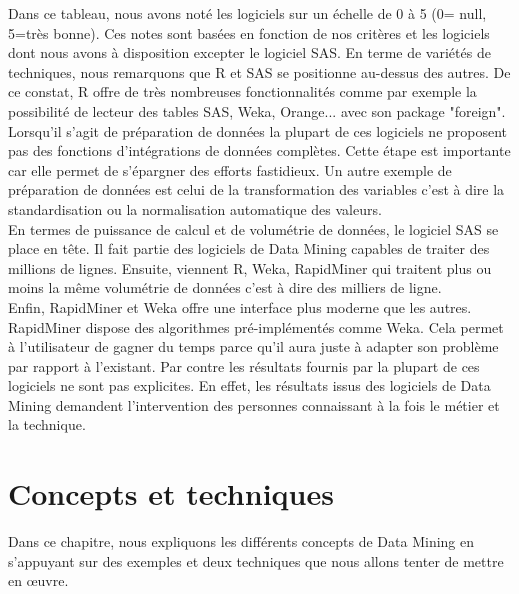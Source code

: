 \documentclass[11pt,a4paper]{report}
\begin{document}
Dans ce tableau, nous avons noté les logiciels sur un échelle de 0 à 5 (0= null, 5=très bonne). Ces notes sont basées en fonction de nos critères et les logiciels dont nous avons à disposition excepter le logiciel SAS. En terme de variétés de techniques, nous remarquons que R et SAS se positionne au-dessus des autres. De ce constat, R  offre de très nombreuses fonctionnalités comme par exemple la possibilité de lecteur des tables SAS, Weka, Orange... avec son package "foreign".\\
Lorsqu'il s'agit de préparation de données la plupart de ces logiciels ne proposent pas des fonctions d'intégrations de données complètes. Cette étape est importante car elle permet de s'épargner des efforts fastidieux. Un autre exemple de préparation de données est celui de la transformation des variables c'est à dire la standardisation ou la normalisation automatique des valeurs. \\
En termes de puissance de calcul et de volumétrie de données, le logiciel SAS se place en tête. Il fait partie des logiciels de Data Mining capables de traiter des millions de lignes. Ensuite, viennent R, Weka, RapidMiner qui traitent plus ou moins la même volumétrie de données c'est à dire des milliers de ligne. \\

Enfin, RapidMiner et Weka offre une interface plus moderne que les autres. RapidMiner dispose des algorithmes pré-implémentés comme Weka. Cela permet à l'utilisateur de gagner du temps parce qu’il aura juste à adapter son problème par rapport à l'existant. Par contre les résultats fournis par la plupart  de ces logiciels ne sont pas explicites. En effet, les résultats issus des logiciels de Data Mining demandent l'intervention des personnes connaissant à la fois le métier et la technique.

 
\newpage

\section{Concepts et techniques \label{concept_et_technique}}
%
%
%
Dans ce chapitre, nous expliquons les différents concepts de Data Mining en s'appuyant sur des exemples et deux techniques que nous allons tenter de mettre en œuvre. 
\end{document}
